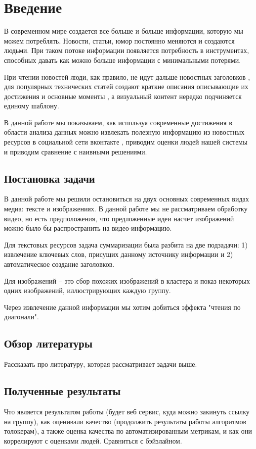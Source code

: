 \documentclass[aps,%
12pt,%
final,%
oneside,
onecolumn,%
musixtex, %
superscriptaddress,%
centertags]{article} %
\begin{document}
\section{Введение}
В современном мире создается все больше и больше информации, которую мы можем потреблять.
Новости, статьи, юмор постоянно меняются и создаются людьми. При таком потоке информации
появляется потребность в инструментах, способных давать как можно больше информации
с минимальными потерями.

При чтении новостей люди, как правило, не идут дальше новостных заголовков \cite{},
для популярных технических статей создают краткие описания описывающие их достижения
и основные моменты \cite{}, а визуальный контент нередко подчиняется единому шаблону.

В данной работе мы показываем, как используя современные достижения в области анализа
данных можно извлекать полезную информацию из новостных ресурсов в социальной сети вконтакте \cite{},
приводим оценки людей нашей системы и приводим сравнение с наивными решениями.

\subsection{Постановка задачи}
В данной работе мы решили остановиться на двух основных современных видах медиа: тексте и
изображениях. В данной работе мы не рассматриваем обработку видео, но есть предположения,
что предложенные идеи насчет изображений можно было бы распространить на видео-информацию.

Для текстовых ресурсов задача суммаризации была разбита на две подзадачи: 1) извлечение
ключевых слов, присущих данному источнику информации и 2) автоматическое создание заголовков.

Для изображений -- это сбор похожих изображений в кластера и показ некоторых
одних изображений, иллюстрирующих каждую группу.

Через извлечение данной информации мы хотим добиться эффекта "чтения по диагонали".
\subsection{Обзор литературы}
Рассказать про литературу, которая рассматривает задачи выше.
\subsection{Полученные результаты}
Что является результатом работы (будет веб сервис, куда можно закинуть ссылку на группу),
как оценивали качество (продолжить результаты работы алгоритмов толокерам), а также
оценка качества по автоматизированным метрикам, и как они коррелируют с оценками людей.
Сравниться с бэйзлайном.
\end{document}
